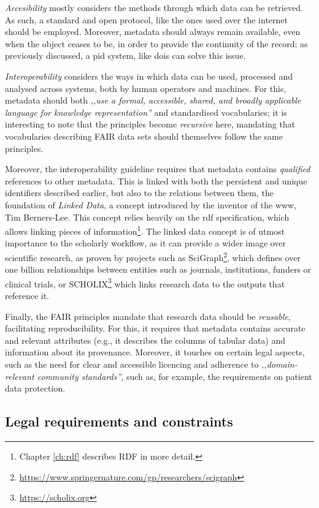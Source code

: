 \emph{Accesibility} mostly considers the methods through which data can be retrieved. As such, a standard and open protocol, like the ones used over the internet should be employed. Moreover, metadata should always remain available, even when the object ceases to be, in order to provide the continuity of the record; as previously discussed, a \gls{pid} system, like \glspl{doi} can solve this issue.

\emph{Interoperability} considers the ways in which data can be used, processed and analysed across systems, both by human operators and machines. For this, metadata should both \emph{,,use a formal, accessible, shared, and broadly applicable language for knowledge representation''}\cite{fair} and standardised vocabularies; it is interesting to note that the principles become \emph{recursive} here, mandating that vocabularies describing FAIR data sets should themselves follow the same principles.

Moreover, the interoperability guideline requires that metadata contains \emph{qualified} references to other metadata. This is linked with both the persistent and unique identifiers described earlier, but also to the relations between them, the foundation of \emph{Linked Data}, a concept introduced by the inventor of the \gls{www}, Tim Berners-Lee. This concept relies heavily on the \gls{rdf} specification\cite{rdf}, which allows linking pieces of information\footnote{Chapter \ref{ch:rdf} describes RDF in more detail.}. The linked data concept is of utmost importance to the scholarly workflow, as it can provide a wider image over scientific research, as proven by projects such as SciGraph\footnote{\url{https://www.springernature.com/gp/researchers/scigraph}}, which defines over one billion relationships between entities such as journals, institutions, funders or clinical trials, or SCHOLIX\footnote{\url{https://scholix.org}} which links research data to the outputs that reference it.
 
 Finally, the FAIR principles mandate that research data should be \emph{reusable}, facilitating reproducibility. For this, it requires that metadata contains accurate and relevant attributes (e.g., it describes the columns of tabular data) and information about its provenance. Moreover, it touches on certain legal aspects, such as the need for clear and accessible licencing and adherence to \emph{,,domain-relevant community standards''}, such as, for example, the requirements on patient data protection.

\subsection{Legal requirements and constraints}
\label{subsec:legal}

